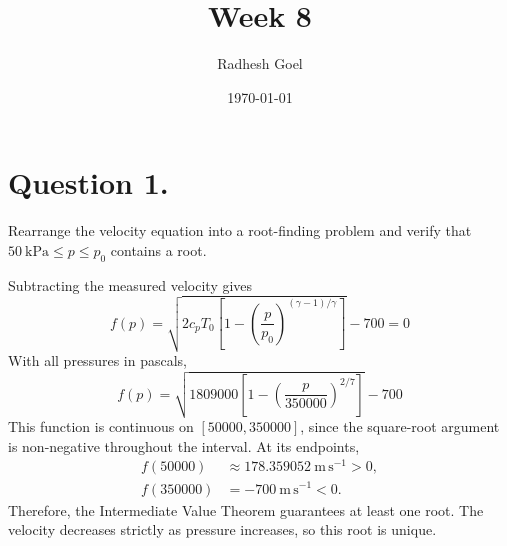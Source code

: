 \documentclass[a4paper]{exam}
\title{Week 8}
\author{Radhesh Goel}
\date{\today}
\begin{document}
\maketitle

\section*{Question 1.}

Rearrange the velocity equation into a root-finding problem and verify
that \(50\ \mathrm{kPa} \leq p \leq p_0\) contains a root.

\begin{solution}
  Subtracting the measured velocity gives
  \[
    \boxed{f(p)=\sqrt{2c_pT_0
      \left[1-\left(\frac{p}{p_0}\right)^{(\gamma-1)/\gamma}\right]}-700=0}
  \]
  With all pressures in pascals,
  \[
    f(p)=\sqrt{1809000\left[1-
      \left(\frac{p}{350000}\right)^{2/7}\right]}-700
  \]
  This function is continuous on \([50000,350000]\), since the square-root
  argument is non-negative throughout the interval. At its endpoints,
  \[
    \begin{aligned}
      f(50000)&\approx 178.359052\ \mathrm{m\,s^{-1}}>0,\\
      f(350000)&=-700\ \mathrm{m\,s^{-1}}<0.
    \end{aligned}
  \]
  Therefore, the Intermediate Value Theorem guarantees at least one root.
  The velocity decreases strictly as pressure increases, so this root is
  unique.
\end{solution}
\end{document}
